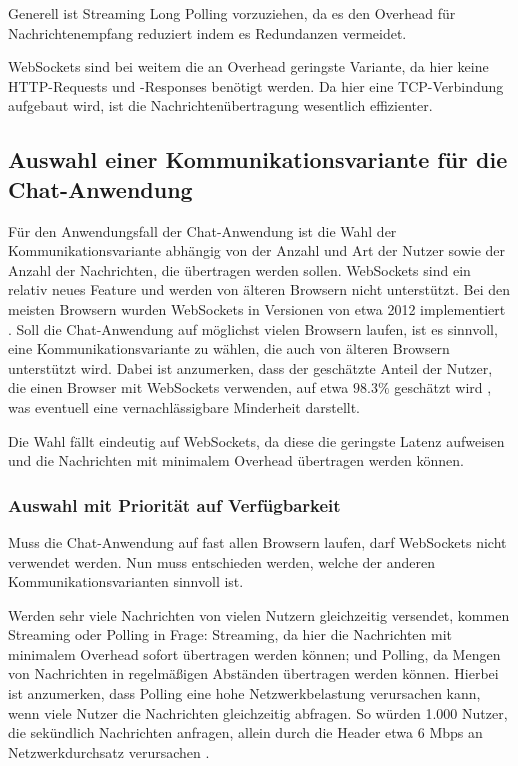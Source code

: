 \documentclass[sigplan, screen]{acmart}
\begin{document}
Generell ist Streaming Long Polling vorzuziehen, da es den Overhead für Nachrichtenempfang reduziert indem es Redundanzen vermeidet.

WebSockets sind bei weitem die an Overhead geringste Variante, da hier keine HTTP-Requests und -Responses benötigt werden.
Da hier eine TCP-Verbindung aufgebaut wird, ist die Nachrichtenübertragung wesentlich effizienter.

\subsection{Auswahl einer Kommunikationsvariante für die Chat-Anwendung}

Für den Anwendungsfall der Chat-Anwendung ist die Wahl der Kommunikationsvariante abhängig von der Anzahl und Art der Nutzer sowie der Anzahl der Nachrichten, die übertragen werden sollen.
WebSockets sind ein relativ neues Feature und werden von älteren Browsern nicht unterstützt.
Bei den meisten Browsern wurden WebSockets in Versionen von etwa 2012 implementiert \cite{deveria_web_nodate}.
Soll die Chat-Anwendung auf möglichst vielen Browsern laufen, ist es sinnvoll, eine Kommunikationsvariante zu wählen, die auch von älteren Browsern unterstützt wird.
Dabei ist anzumerken, dass der geschätzte Anteil der Nutzer, die einen Browser mit WebSockets verwenden, auf etwa $98.3\%$ geschätzt wird \cite{deveria_web_nodate}, was eventuell eine vernachlässigbare Minderheit darstellt.

Die Wahl fällt eindeutig auf WebSockets, da diese die geringste Latenz aufweisen \cite{pimentel_communicating_2012} und die Nachrichten mit minimalem Overhead übertragen werden können.

\subsubsection{Auswahl mit Priorität auf Verfügbarkeit}

Muss die Chat-Anwendung auf fast allen Browsern laufen, darf WebSockets nicht verwendet werden.
Nun muss entschieden werden, welche der anderen Kommunikationsvarianten sinnvoll ist.

Werden sehr viele Nachrichten von vielen Nutzern gleichzeitig versendet, kommen Streaming oder Polling in Frage:
Streaming, da hier die Nachrichten mit minimalem Overhead sofort übertragen werden können; und 
Polling, da Mengen von Nachrichten in regelmäßigen Abständen übertragen werden können.
Hierbei ist anzumerken, dass Polling eine hohe Netzwerkbelastung verursachen kann, wenn viele Nutzer die Nachrichten gleichzeitig abfragen.
So würden 1.000 Nutzer, die sekündlich Nachrichten anfragen, allein durch die Header etwa 6 Mbps an Netzwerkdurchsatz verursachen \cite{lubbers_html5_nodate}.
\end{document}
